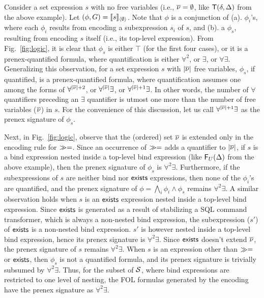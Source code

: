 Consider a set expression $s$ with no free variables (i.e., $\overline{\nu} =
\emptyset$, like ${\sf T}(\delta,\Delta)$ from the above example). Let
$(\phi,G) = \llbracket s \rrbracket_{\langle \emptyset \rangle}$. Note that $\phi$ is a conjunction
of (a).  $\phi_i$'s, where each $\phi_i$ results from encoding a
subexpression $s_i$ of $s$, and (b). a $\phi_s$, resulting from
encoding $s$ itself (i.e., its top-level expression). From Fig.~\ref{fig:logic},
it is clear that $\phi_s$ is either $\top$ (for the first four cases),
or it is a prenex-quantified formula, where quantification is either
$\forall^2$, or $\exists$, or $\forall\exists$. Generalizing this
observation, for a set expression $s$ with $|\overline{\nu}|$ free variables,
$\phi_s$, if quantified, is a prenex-quantified formula, where
quantification assumes one among the forms of $\forall^{|\overline{\nu}|+2}$,
or $\forall^{|\overline{\nu}|}\exists$, or $\forall^{|\overline{\nu}|+1}\exists$.  In
other words, the number of $\forall$ quantifiers preceding an
$\exists$ quantifier is utmost one more than the number of free
variables ($\overline{\nu}$) in $s$. For the convenience of this discussion,
let us call $\forall^{|\overline{\nu}|+1}\exists$ as the prenex signature of
$\phi_s$. 

Next, in Fig.~\ref{fig:logic}, observe that the (ordered) set $\overline{\nu}$
is extended only in the encoding rule for $\gg=$. Since an occurrence
of $\gg=$ adds a quantifier to $|\overline{\nu}|$, if $s$ is a bind
expression nested inside a top-level bind expression (like
${\sf F}_U(\Delta)$ from the above example), then the prenex signature
of $\phi_s$ is $\forall^2\exists$.  Furthermore, if the subexpressions
of $s$ are neither {bind} nor ${\sf exists}$ expressions, then none of the
$\phi_i$'s are quantified, and the prenex signature of $\phi = \bigwedge_i\phi_i \wedge \phi_s$
remains $\forall^2\exists$. A similar
observation holds when $s$ is an ${\sf exists}$ expression nested inside a
top-level {bind} expression.  Since ${\sf exists}$ is generated as a
result of stabilizing a SQL command transformer, which is always a
non-nested bind expression, the subexpression ($s'$) of ${\sf exists}$ is
a non-nested bind expression. $s'$ is however nested inside a
top-level bind expression, hence its prenex signature is
$\forall^2\exists$.  Since ${\sf exists}$ doesn't extend $\overline{\nu}$, the
prenex signature of $s$ remains $\forall^2\exists$. When $s$ is an
expression other than $\gg=$ or ${\sf exists}$, then $\phi_s$ is not a
quantified formula, and its prenex signature is trivially subsumed by
$\forall^2\exists$. Thus, for the subset of $\mathcal{S}$, where bind
expressions are restricted to one level of nesting, the FOL formulas
generated by the encoding have the prenex signature as
$\forall^2\exists$.

